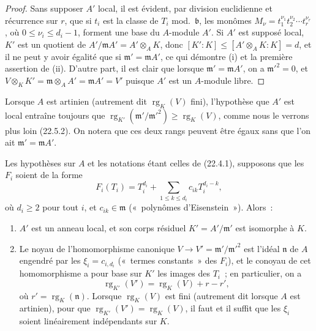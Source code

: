 \begin{proof}
Sans supposer $A'$ local, il est évident, par division euclidienne et
récurrence sur $r$, que si $t_i$ est la classe de $T_i$ mod.~$\mathfrak b$,
les monômes
$M_\nu=t_1^{\nu_1}t_2^{\nu_2}\cdots t_r^{\nu_r}$, où
$0\leqslant\nu_i\leqslant d_i-1$, forment une base du $A$-module $A'$. Si
$A'$ est supposé local, $K'$ est un quotient de
$A'/\mathfrak mA'=A'\otimes_AK$, donc
$[K':K]\leqslant[A'\otimes_AK:K]=d$, et il ne peut y avoir égalité que si
$\mathfrak m'=\mathfrak mA'$, ce qui démontre (i) et la première assertion
de (ii). D'autre part, il est clair que lorsque
$\mathfrak m'=\mathfrak mA'$, on a $\mathfrak m'^2=0$, et
$V\otimes_KK'=\mathfrak m\otimes_AA'=\mathfrak mA'=V'$ puisque $A'$ est
un $A$-module libre.
\end{proof}

\begin{remark}[22.4.2]
\label{0.22.4.2-fr}
Lorsque $A$ est artinien (autrement dit $\operatorname{rg}_K(V)$ fini),
l'hypothèse que $A'$ est local entraîne toujours que
$\operatorname{rg}_{K'}(\mathfrak m'/\mathfrak m'^2)
\geqslant\operatorname{rg}_K(V)$, comme nous le verrons plus loin (22.5.2).
On notera que ces deux rangs peuvent être égaux sans que l'on ait
$\mathfrak m'=\mathfrak mA'$.
\end{remark}

\begin{proposition}[22.4.3]
\label{0.22.4.3-fr}
Les hypothèses sur $A$ et les notations étant celles de (22.4.1), supposons
que les $F_i$ soient de la forme
\begin{equation}
\label{0.22.4.3.1-fr}
  F_i(T_i)=T_i^{d_i}+\sum_{1\leqslant k\leqslant d_i}
  c_{ik}T_i^{d_i-k},
  \tag{22.4.3.1}
\end{equation}
où $d_i\geqslant2$ pour tout $i$, et $c_{ik}\in\mathfrak m$
(«~polynômes d'Eisenstein~»). Alors~:
\begin{enumerate}
  \item[(i)] $A'$ est un anneau local, et son corps résiduel
  $K'=A'/\mathfrak m'$ est isomorphe à $K$.


  \item[(ii)] Le noyau de l'homomorphisme canonique
  $V\to V'=\mathfrak m'/\mathfrak m'^2$ est l'idéal $\mathfrak n$ de $A$
  engendré par les $\xi_i=c_{i,d_i}$ («~termes constants~» des $F_i$), et
  le conoyau de cet homomorphisme a pour base sur $K'$ les images des $T_i$~;
  en particulier, on a
  \begin{equation}
  \label{0.22.4.3.2-fr}
    \operatorname{rg}_{K'}(V')=\operatorname{rg}_K(V)+r-r',
    \tag{22.4.3.2}
  \end{equation}
  où $r'=\operatorname{rg}_K(\mathfrak n)$. Lorsque
  $\operatorname{rg}_K(V)$ est fini (autrement dit lorsque $A$ est
  artinien), pour que
  $\operatorname{rg}_{K'}(V')=\operatorname{rg}_K(V)$, il faut et il suffit
  que les $\xi_i$ soient linéairement indépendants sur $K$.
\end{enumerate}
\end{proposition}

